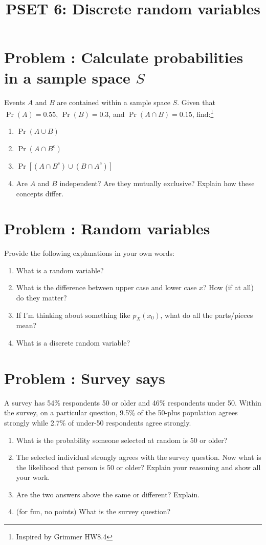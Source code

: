 \documentclass[11pt]{article}
\title{PSET 6: Discrete random variables}
\author{}
\date{\vspace{-2.5em}}
\newcounter{problem}
\newcommand{\problem}[1]{\stepcounter{problem}\section*{Problem \theproblem: #1}}
\begin{document}
\maketitle



\problem{Calculate probabilities in a sample space $S$}

Events $A$ and $B$ are contained within a sample space $S$. Given that
$\Pr(A) = 0.55$, $\Pr(B) = 0.3$, and $\Pr(A \cap B) = 0.15$,
find:\footnote{Inspired by Grimmer HW8.4}

\begin{enumerate}[label=\alph*.]
\item $\Pr(A \cup B)$
\item $\Pr(A \cap B^c)$
\item $\Pr\left[(A \cap B^c) \cup (B \cap A^c)\right]$
\item Are $A$ and $B$ independent? Are they mutually exclusive? Explain
  how these concepts differ.
\end{enumerate}

\problem{Random variables}

Provide the following explanations in your own words:

\begin{enumerate}[label=\alph*.]
\item What is a random variable?
\item What is the difference between upper case and lower case $x$?
  How (if at all) do they matter?
\item If I'm thinking about something like $p_X(x_0)$, what do all the
  parts/pieces mean?
\item What is a discrete random variable?
\end{enumerate}

\problem{Survey says}

A survey has 54\% respondents 50 or older and 46\% respondents under 50.
Within the survey, on a particular question, 9.5\% of the 50-plus
population agrees strongly while 2.7\% of under-50 respondents agree
strongly.

\begin{enumerate}[label=\alph*.]
\item What is the probability someone selected at random is 50 or older?
\item The selected individual strongly agrees with the survey question.
  Now what is the likelihood that person is 50 or older? Explain your
  reasoning and show all your work.
\item Are the two answers above the same or different? Explain.
\item (for fun, no points) What is the survey question?
\end{enumerate}
\end{document}
